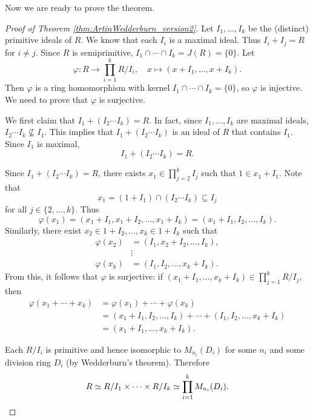 Now we are ready to prove the theorem. 

\begin{proof}[Proof of Theorem \ref{thm:ArtinWedderburn_version2}]
    Let $I_1,\dots,I_k$ be the (distinct) primitive ideals of $R$. 
    We know that each $I_i$ is a maximal ideal. Thus $I_i+I_j=R$ for
    $i\ne j$. Since $R$ is semiprimitive, 
    $I_1\cap\cdots\cap I_k=J(R)=\{0\}$. Let 
    \[
    \varphi\colon R\to \prod_{i=1}^k R/I_i,\quad
    x\mapsto (x+I_1,\dots,x+I_k).
    \]
    Then $\varphi$ is a ring homomorphism with kernel $I_1\cap\cdots\cap I_k=\{0\}$, so
    $\varphi$ is injective. We need to prove that $\varphi$ is surjective. 
    
    We first claim that 
    $I_1+( I_2\cdots I_k) = R$. In fact, 
    since $I_1,\dots,I_k$ are maximal ideals, $I_2\cdots I_k\not\subseteq I_1$. This implies
    that $I_1+(I_2\cdots I_k)$ is an ideal of $R$ that contains $I_1$. Since $I_1$ is maximal, 
    \[
    I_1+(I_2\cdots I_k)=R.
    \]
    
    Since $I_1+( I_2\cdots I_k) = R$, 
    there exists $x_1\in \prod_{j=2}^kI_j$ such that $1\in x_1+I_1$. Note that
    \[
    x_1=(1+I_1)\cap (I_2\cdots I_k)\subseteq I_j
    \]
    for all $j\in\{2,\dots,k\}$. 
    Thus 
    \[
    \varphi(x_1)=(x_1+I_1,x_1+I_2,\dots,x_1+I_k)=(x_1+I_1,I_2,\dots, I_k).
    \]
    Similarly,
    there exist $x_2\in 1+I_2,\dots, x_k\in 1+I_k$ such that 
    \begin{align*}
    \varphi(x_2)&=(I_1,x_2+I_2,\dots,I_k),\\
    &\vdots\\
    \varphi(x_k)&=(I_1,I_2,\dots,x_k+I_k).
    \end{align*}
    From this, it follows that $\varphi$ is surjective: if $(x_1+I_1,\dots,x_k+I_k)\in\prod_{j=1}^kR/I_j$, then
    \begin{align*}
        \varphi(x_1+\cdots+x_k) &= \varphi(x_1)+\cdots+\varphi(x_k)\\
        &=(x_1+I_1,I_2,\dots,I_k)+\cdots+(I_1,I_2,\dots,x_k+I_k)\\
        &=(x_1+I_1,\dots,x_k+I_k).
    \end{align*}
    
    Each $R/I_i$ 
    is primitive and hence isomorphic to $M_{n_i}(D_i)$ for some 
    $n_i$ and some division ring $D_i$ (by Wedderburn's theorem). Therefore
    \[
    R\simeq R/I_1\times\cdots\times R/I_k\simeq \prod_{i=1}^kM_{n_i}(D_i).\qedhere 
    \]
\end{proof}



